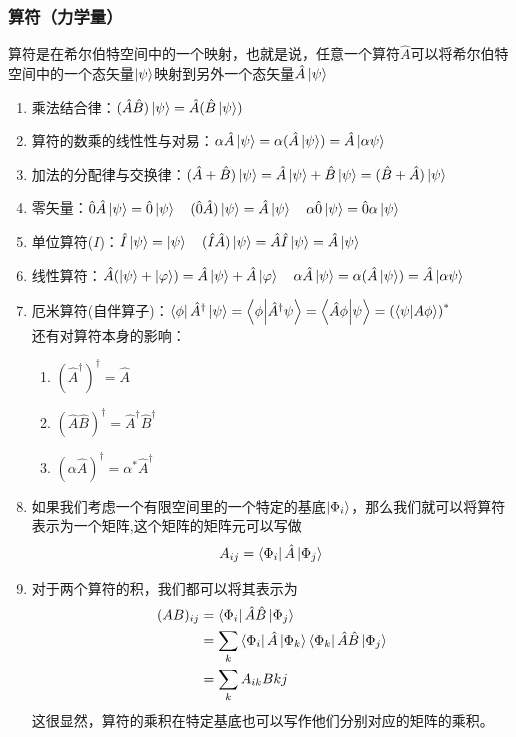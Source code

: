 \documentclass{article}
\newcommand{\h}[1]{\hat{#1}}
\begin{document}
\subsubsection{算符（力学量）}
算符是在希尔伯特空间中的一个映射，也就是说，任意一个算符$\hat{A}$可以将希尔伯特空间中的一个态矢量$\ket{\psi}$映射到另外一个态矢量$\hat{A}\ket{\psi}$
\begin{enumerate}
    \item 乘法结合律：$(\hat{A}\hat{B})\ket{\psi}=\hat{A}(\hat{B}\ket{\psi})$
    \item 算符的数乘的线性性与对易：$\alpha\hat{A}\ket{\psi}=\alpha(\hat{A}\ket{\psi})=\hat{A}\ket{\alpha\psi}$
    \item 加法的分配律与交换律：$(\hat{A}+\hat{B})\ket{\psi}=\hat{A}\ket{\psi}+\hat{B}\ket{\psi}=(\hat{B}+\hat{A})\ket{\psi}$
    \item 零矢量：$\hat{0}\hat{A}\ket{\psi}=\hat{0}\ket{\psi}\quad(\hat{0}\hat{A})\ket{\psi}=\hat{A}\ket{\psi}\quad\alpha\hat{0}\ket{\psi}=\hat{0}\alpha\ket{\psi}$
    \item 单位算符($I$)：$\hat{I}\ket{\psi}=\ket{\psi}\quad(\hat{I}\hat{A})\ket{\psi}=\hat{A}\hat{I}\ket{\psi}=\hat{A}\ket{\psi}$
    \item 线性算符：$\hat{A}(\ket{\psi}+\ket{\varphi})=\hat{A}\ket{\psi}+\hat{A}\ket{\varphi}\quad\alpha\hat{A}\ket{\psi}=\alpha(\hat{A}\ket{\psi})=\hat{A}\ket{\alpha\psi}$
    \item 厄米算符(自伴算子)：$\bra{\phi}\hat{A}^\dagger\ket{\psi}=\braket{\phi}{\hat{A}^\dagger\psi}=\braket{\hat{A}\phi}{\psi}=\left(\braket{\psi}{A\phi}\right)^*$\\
    还有对算符本身的影响：
    \begin{enumerate}
        \item $(\hat{A}^\dagger)^\dagger=\hat{A}$
        \item $(\hat{A}\hat{B})^\dagger=\h{A}^\dagger\h{B}^\dagger$
        \item $(\alpha\h{A})^\dagger=\alpha^*\h{A}^\dagger$
    \end{enumerate}
    \item 如果我们考虑一个有限空间里的一个特定的基底$\ket{\Phi_i}$，那么我们就可以将算符表示为一个矩阵,这个矩阵的矩阵元可以写做
    \[A_{ij}=\bra{\Phi_i}\h{A}\ket{\Phi_j}\]
    \item 对于两个算符的积，我们都可以将其表示为
    \begin{align*}
        (AB)_{ij}&=\bra{\Phi_i}\h{A}\h{B}\ket{\Phi_j}\\
        &=\sum_k\bra{\Phi_i}\h{A}\ket{\Phi_k}\bra{\Phi_k}\h{A}\h{B}\ket{\Phi_j}\\
        &=\sum_kA_{ik}B{kj}
    \end{align*}
    这很显然，算符的乘积在特定基底也可以写作他们分别对应的矩阵的乘积。


\end{enumerate}
\end{document}
